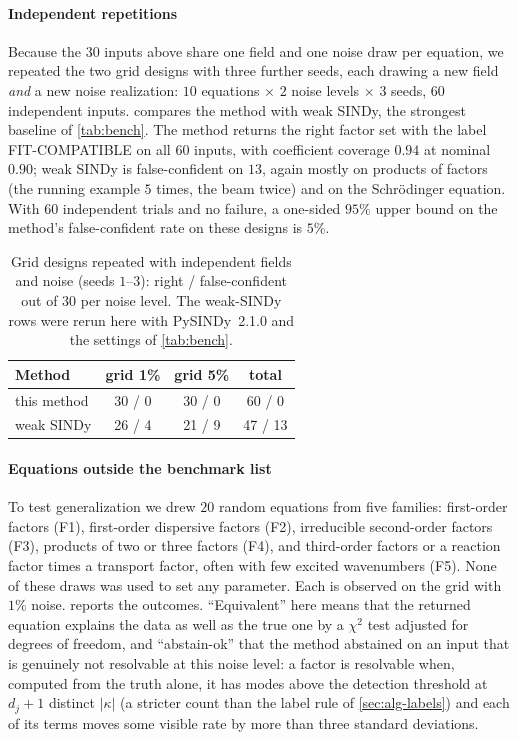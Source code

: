 \documentclass[11pt]{article}
\theoremstyle{plain}
\theoremstyle{definition}
\theoremstyle{remark}
\newcommand{\lab}[1]{\textsf{#1}}           %
\newcommand{\FC}{\lab{FIT-COMPATIBLE}}
\newcommand{\abs}[1]{\lvert#1\rvert}
\begin{document}
\paragraph{Independent repetitions} Because the $30$ inputs above share one field and one noise draw per equation,
we repeated the two grid designs with three further seeds, each drawing a new field \emph{and} a new noise
realization: $10$ equations $\times$ $2$ noise levels $\times$ $3$ seeds, $60$ independent inputs. 
compares the method with weak SINDy, the strongest baseline of \cref{tab:bench}. The method returns the right factor
set with the label \FC{} on all $60$ inputs, with coefficient coverage $0.94$ at nominal $0.90$; weak SINDy is
false-confident on $13$, again mostly on products of factors (the running example $5$ times, the beam twice) and on the
Schr\"odinger equation. With $60$ independent trials and no failure, a one-sided $95\%$ upper bound on the method's
false-confident rate on these designs is $5\%$.

\begin{table}[tbp]
\centering\small
\caption{Grid designs repeated with independent fields and noise (seeds $1$--$3$): right / false-confident out of $30$
per noise level. The weak-SINDy rows were rerun here with PySINDy~2.1.0 and the settings of \cref{tab:bench}.}\label{tab:multiseed}
\begin{tabular}{@{}lccc@{}}
\toprule
Method & grid 1\% & grid 5\% & total\\
\midrule
this method & 30 / 0 & 30 / 0 & 60 / 0\\
weak SINDy  & 26 / 4 & 21 / 9 & 47 / 13\\
\bottomrule
\end{tabular}
\end{table}

\paragraph{Equations outside the benchmark list} To test generalization we drew $20$ random equations
from five families: first-order factors (F1), first-order dispersive factors (F2), irreducible
second-order factors (F3), products of two or three factors (F4), and third-order factors or a reaction
factor times a transport factor, often with few excited wavenumbers (F5). None of these draws was used to
set any parameter. Each is observed on the grid
with $1\%$ noise.  reports the outcomes. ``Equivalent'' here means that the returned
equation explains the data as well as the true one by a $\chi^2$ test adjusted for degrees of freedom, and
``abstain-ok'' that the method abstained on an input that is genuinely not resolvable at this noise level:
a factor is resolvable when, computed from the truth alone, it has modes above the detection threshold at
$d_j+1$ distinct $\abs\kappa$ (a stricter count than the label rule of \cref{sec:alg-labels}) and each of its terms moves some visible rate by more than three standard deviations.
\end{document}
